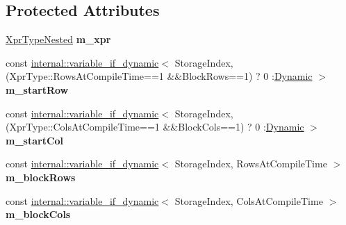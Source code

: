 \subsection*{Protected Attributes}
\begin{DoxyCompactItemize}
\item 
\mbox{\label{class_eigen_1_1internal_1_1_block_impl__dense_a8abb3255400f15ed99ce723c49615c0a}} 
\hyperlink{class_eigen_1_1internal_1_1_tensor_lazy_evaluator_writable}{Xpr\+Type\+Nested} {\bfseries m\+\_\+xpr}
\item 
\mbox{\label{class_eigen_1_1internal_1_1_block_impl__dense_acc81c7e99b266f19af021154cc951eff}} 
const \hyperlink{class_eigen_1_1internal_1_1variable__if__dynamic}{internal\+::variable\+\_\+if\+\_\+dynamic}$<$ Storage\+Index,(Xpr\+Type\+::\+Rows\+At\+Compile\+Time==1 \&\&Block\+Rows==1) ? 0 \+:\hyperlink{namespace_eigen_ad81fa7195215a0ce30017dfac309f0b2}{Dynamic} $>$ {\bfseries m\+\_\+start\+Row}
\item 
\mbox{\label{class_eigen_1_1internal_1_1_block_impl__dense_af2fd1b40d54794899a3f1df086802fb9}} 
const \hyperlink{class_eigen_1_1internal_1_1variable__if__dynamic}{internal\+::variable\+\_\+if\+\_\+dynamic}$<$ Storage\+Index,(Xpr\+Type\+::\+Cols\+At\+Compile\+Time==1 \&\&Block\+Cols==1) ? 0 \+:\hyperlink{namespace_eigen_ad81fa7195215a0ce30017dfac309f0b2}{Dynamic} $>$ {\bfseries m\+\_\+start\+Col}
\item 
\mbox{\label{class_eigen_1_1internal_1_1_block_impl__dense_a19edc79d5d537d84670b4c6fc7222256}} 
const \hyperlink{class_eigen_1_1internal_1_1variable__if__dynamic}{internal\+::variable\+\_\+if\+\_\+dynamic}$<$ Storage\+Index, Rows\+At\+Compile\+Time $>$ {\bfseries m\+\_\+block\+Rows}
\item 
\mbox{\label{class_eigen_1_1internal_1_1_block_impl__dense_a88ebc5d1e868cb113e73f82d7da910eb}} 
const \hyperlink{class_eigen_1_1internal_1_1variable__if__dynamic}{internal\+::variable\+\_\+if\+\_\+dynamic}$<$ Storage\+Index, Cols\+At\+Compile\+Time $>$ {\bfseries m\+\_\+block\+Cols}
\end{DoxyCompactItemize}


